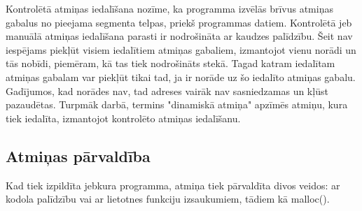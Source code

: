 Kontrolētā atmiņas iedalīšana nozīme, ka programma izvēlās brīvus atmiņas gabalus no pieejama segmenta telpas, priekš programmas datiem. 
Kontrolētā jeb manuālā atmiņas iedalīšana parasti ir nodrošināta ar kaudzes palīdzību.
Šeit nav iespējams piekļūt visiem iedalītiem atmiņas gabaliem, izmantojot vienu norādi un tās nobīdi, piemēram, kā tas tiek nodrošināts stekā. 
Tagad katram iedalītam atmiņas gabalam var piekļūt tikai tad, ja ir norāde uz šo iedalīto atmiņas gabalu. 
Gadījumos, kad norādes nav, tad adreses vairāk nav sasniedzamas un kļūst pazaudētas.
Turpmāk darbā, termins "dinamiskā atmiņa" apzīmēs atmiņu, kura tiek iedalīta, izmantojot kontrolēto atmiņas iedalīšanu.


\subsection{Atmiņas pārvaldība}
Kad tiek izpildīta jebkura programma, atmiņa tiek pārvaldīta divos veidos: ar kodola palīdzību vai ar lietotnes funkciju izsaukumiem, tādiem kā malloc().

